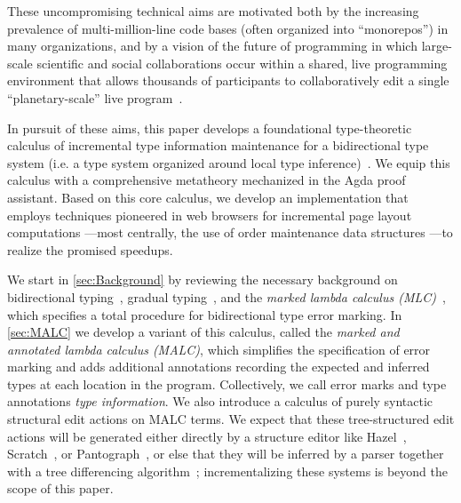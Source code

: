 These uncompromising technical aims are motivated both by the increasing prevalence of multi-million-line code bases (often organized into ``monorepos'') in many organizations, and by a vision of the future of programming in which large-scale scientific and social collaborations occur within a shared, live programming environment that allows thousands of participants to collaboratively edit a single ``planetary-scale'' live program~\cite{hazel-propl,holcomb2023case}. 

In pursuit of these aims, this paper develops a foundational type-theoretic calculus of incremental type information maintenance for a bidirectional type system (i.e. a type system organized around local type inference)~\cite{DBLP:journals/csur/DunfieldK21,pierce2000}. We equip this calculus with a comprehensive metatheory mechanized in the Agda proof assistant. Based on this core calculus, we develop an implementation that employs techniques pioneered in web browsers for incremental page layout computations \cite{ST}---most centrally, the use of order maintenance data structures \cite{DBLP:conf/esa/BenderCDFZ02}---to realize the promised speedups. 

We start in \autoref{sec:Background} by reviewing the necessary background on bidirectional typing~\cite{DBLP:journals/csur/DunfieldK21,pierce2000}, gradual typing~\cite{siek2006,siek2015}, and the \emph{marked lambda calculus (MLC)}~\cite{DBLP:journals/pacmpl/ZhaoMDBPO24}, which specifies a total procedure for bidirectional type error marking. In \autoref{sec:MALC} we develop a variant of this calculus, called the \emph{marked and annotated lambda calculus (MALC)}, which simplifies the specification of error marking and adds additional annotations recording the expected and inferred types at each location in the program. Collectively, we call error marks and type annotations \emph{type information}. We also introduce a calculus of purely syntactic structural edit actions on MALC terms. We expect that these tree-structured edit actions will be generated either directly by a structure editor like Hazel~\cite{omar2017b}, Scratch~\cite{maloney2010scratch}, or Pantograph~\cite{prinz2025pantograph}, or else that they will be inferred by a parser together with a tree differencing algorithm~\cite{chawathe1997meaningful}; incrementalizing these systems is beyond the scope of this paper.

